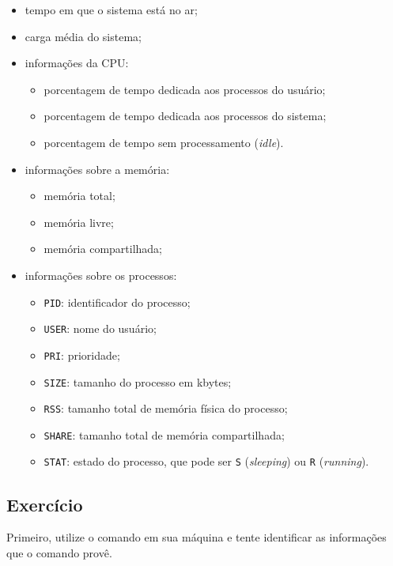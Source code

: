 \begin{itemize}
\setlength{\itemsep}{1pt}\setlength{\parskip}{0pt}  \setlength{\parsep}{0pt}
\item tempo em que o sistema está no ar;
\item carga média do sistema;
\item informações da CPU:
\begin{itemize}
\setlength{\itemsep}{1pt}\setlength{\parskip}{0pt}  \setlength{\parsep}{0pt}
\item porcentagem de tempo dedicada aos processos do usuário;
\item porcentagem de tempo dedicada aos processos do sistema;
\item porcentagem de tempo sem processamento (\textit{idle}).
\end{itemize}
\item informações sobre a memória:
\begin{itemize}
\setlength{\itemsep}{1pt}\setlength{\parskip}{0pt}  \setlength{\parsep}{0pt}
\item memória total;
\item memória  livre;
\item memória  compartilhada;
\end{itemize}
\item informações sobre os processos:
\begin{itemize}
\setlength{\itemsep}{1pt}\setlength{\parskip}{0pt}  \setlength{\parsep}{0pt}
\item \texttt{PID}: identificador do processo;
\item \texttt{USER}: nome do usuário;
\item \texttt{PRI}: prioridade;
\item \texttt{SIZE}: tamanho do processo em kbytes;
\item \texttt{RSS}: tamanho total de memória física do processo;
\item \texttt{SHARE}: tamanho total de memória compartilhada;
\item \texttt{STAT}:  estado do processo, que pode ser \texttt{S}  (\textit{sleeping}) ou \texttt{R} (\textit{running}).
\end{itemize}
\end{itemize}

\subsection{Exercício}

Primeiro, utilize o comando  em sua máquina e tente identificar as informações que o comando provê.

